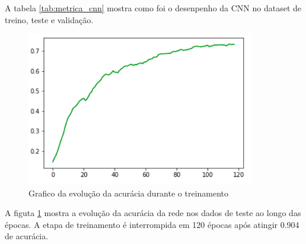 \documentclass[a4paper,10pt]{article}
\begin{document}
A tabela \ref{tab:metrica_cnn} mostra como foi o desenpenho da CNN no dataset de treino, teste e validação. 

\begin{figure}[h!]
        \centering
        \includegraphics[width=10cm]{cnn_treinamento.png}
        \caption{Grafico da evolução da acurácia durante o treinamento}
        \label{fig:cnn_treinamento}
\end{figure}

A figuta \ref{fig:cnn_treinamento} mostra a evolução da acurácia da rede nos dados de teste ao longo das épocas. A etapa de treinamento é interrompida em 120 épocas após atingir 0.904 de acurácia.



\newpage



\end{document}
